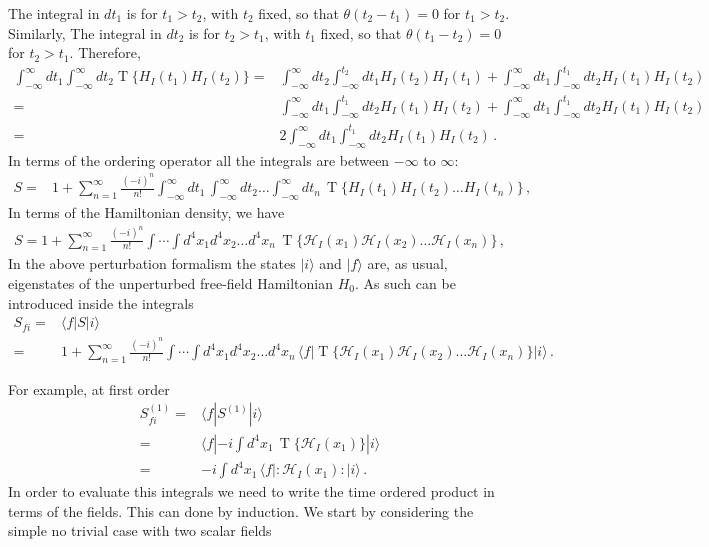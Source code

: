 The integral in $dt_1$ is for $t_1>t_2$, with $t_2$ fixed, so that $\theta(t_2-t_1)=0$ for $t_1>t_2$. Similarly,
The integral in $dt_2$ is for $t_2>t_1$, with $t_1$ fixed, so that $\theta(t_1-t_2)=0$ for $t_2>t_1$. Therefore,
\begin{align}
   \int_{-\infty}^\infty dt_1 \int_{-\infty}^{\infty}d t_2 \operatorname{T}\{H_I(t_1)H_I(t_2)\}=&
\int_{-\infty}^\infty dt_2\int_{-\infty}^{t_2}d t_1 H_I(t_2)H_I(t_1)
+\int_{-\infty}^\infty dt_1\int_{-\infty}^{t_{1}}d t_2 H_I(t_1)H_I(t_2)\nonumber\\
=&
\int_{-\infty}^\infty dt_1\int_{-\infty}^{t_1}d t_2 H_I(t_1)H_I(t_2)
+\int_{-\infty}^\infty dt_1\int_{-\infty}^{t_{1}}d t_2 H_I(t_1)H_I(t_2) \nonumber\\
=&
2\int_{-\infty}^\infty dt_1\int_{-\infty}^{t_1}d t_2 H_I(t_1)H_I(t_2)\,.
\end{align}
In terms of the ordering operator all the integrals are between $-\infty$ to $\infty$:
\begin{align}
   S=&1+\sum_{n=1}^\infty\frac{(-i)^n}{n!}\int_{-\infty}^{\infty}d t_1\,\int_{-\infty}^{\infty} d t_2\ldots\int_{-\infty}^{\infty}d t_n\,\operatorname{T}\{{H}_I(t_1){H}_I(t_2)\ldots{H}_I(t_n)\}\,, 
\end{align}
In terms of the Hamiltonian density, we have
\begin{align}
  S=1+\sum_{n=1}^\infty\frac{(-i)^n}{n!}\int\cdots\int d^4x_1 d^4x_2\ldots d^4x_n\,\operatorname{T}\{\mathcal{H}_I(x_1)\mathcal{H}_I(x_2)\ldots\mathcal{H}_I(x_n)\}\,, 
\end{align}
In the above perturbation formalism the states $|i\rangle$ and $|f\rangle$ are, as usual, eigenstates of the unperturbed free-field Hamiltonian $H_0$. As such can be introduced inside the integrals
\begin{align}
  S_{f i}=&\langle f|S|i\rangle\nonumber\\
  =&1+\sum_{n=1}^\infty\frac{(-i)^n}{n!}\int\cdots\int d^4x_1 d^4x_2\ldots d^4x_n\,\langle f|\operatorname{T}\{\mathcal{H}_I(x_1)\mathcal{H}_I(x_2)\ldots\mathcal{H}_I(x_n)\}|i\rangle\,.
\end{align}


For example, at first order
\begin{align}
  \label{eq:96f}
  S_{fi}^{(1)}=&\langle f|S^{(1)}|i\rangle\nonumber\\
  =&\langle f|-i\int d^4x_1\,\operatorname{T}\{\mathcal{H}_I(x_1)\}|i\rangle\nonumber\\
  =&-i\int d^4x_1\,\langle f|:\mathcal{H}_I(x_1):|i\rangle\,.
\end{align}
In order to evaluate this integrals we need to write the time ordered product in terms of the fields. This can done by induction. We start by considering the simple no trivial case with two scalar fields


